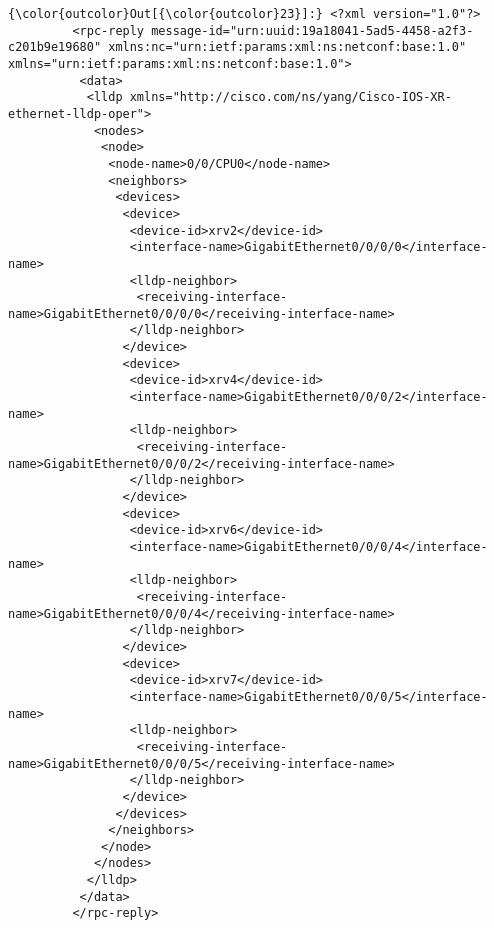 \documentclass[11pt]{article}
\begin{document}
\begin{Verbatim}[commandchars=\\\{\}]
{\color{outcolor}Out[{\color{outcolor}23}]:} <?xml version="1.0"?>
         <rpc-reply message-id="urn:uuid:19a18041-5ad5-4458-a2f3-c201b9e19680" xmlns:nc="urn:ietf:params:xml:ns:netconf:base:1.0" xmlns="urn:ietf:params:xml:ns:netconf:base:1.0">
          <data>
           <lldp xmlns="http://cisco.com/ns/yang/Cisco-IOS-XR-ethernet-lldp-oper">
            <nodes>
             <node>
              <node-name>0/0/CPU0</node-name>
              <neighbors>
               <devices>
                <device>
                 <device-id>xrv2</device-id>
                 <interface-name>GigabitEthernet0/0/0/0</interface-name>
                 <lldp-neighbor>
                  <receiving-interface-name>GigabitEthernet0/0/0/0</receiving-interface-name>
                 </lldp-neighbor>
                </device>
                <device>
                 <device-id>xrv4</device-id>
                 <interface-name>GigabitEthernet0/0/0/2</interface-name>
                 <lldp-neighbor>
                  <receiving-interface-name>GigabitEthernet0/0/0/2</receiving-interface-name>
                 </lldp-neighbor>
                </device>
                <device>
                 <device-id>xrv6</device-id>
                 <interface-name>GigabitEthernet0/0/0/4</interface-name>
                 <lldp-neighbor>
                  <receiving-interface-name>GigabitEthernet0/0/0/4</receiving-interface-name>
                 </lldp-neighbor>
                </device>
                <device>
                 <device-id>xrv7</device-id>
                 <interface-name>GigabitEthernet0/0/0/5</interface-name>
                 <lldp-neighbor>
                  <receiving-interface-name>GigabitEthernet0/0/0/5</receiving-interface-name>
                 </lldp-neighbor>
                </device>
               </devices>
              </neighbors>
             </node>
            </nodes>
           </lldp>
          </data>
         </rpc-reply>
\end{Verbatim}
            

    
    
    
    
\end{document}
